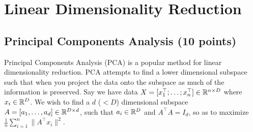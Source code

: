 \section{Linear Dimensionality Reduction}

\subsection{Principal Components Analysis  (10 points)}
\label{sec:pca}

Principal Components Analysis (PCA) is a popular method for linear dimensionality reduction. PCA attempts to find a lower dimensional subspace such that when you project the data onto the subspace as much of the information is preserved. Say we have data $X = [x_1^\top; \dots; x_n^\top] \in \mathbb{R}^{n\times D}$ where  $x_i \in \mathbb{R}^D$. We wish to find a $d$ ($ < D$) dimensional subspace $A = [a_1, \dots, a_d] \in \mathbb{R}^{D\times d}$, such that $ a_i \in \mathbb{R}^D$ and $A^\top A = I_d$, so as to maximize $\frac{1}{n} \sum_{i=1}^n \|A^\top x_i\|^2$.
